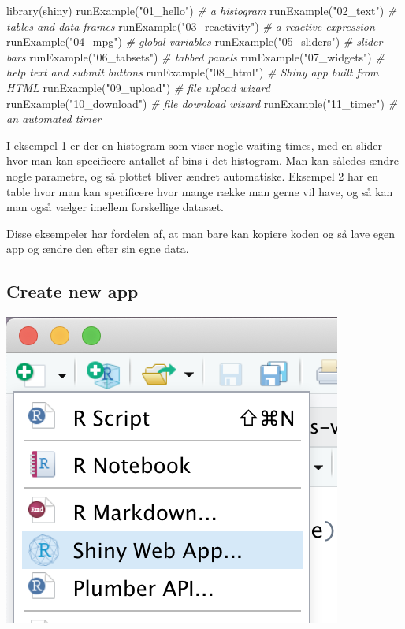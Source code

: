 \documentclass[
]{book}
\newenvironment{Shaded}{\begin{snugshade}}{\end{snugshade}}
\newcommand{\CommentTok}[1]{\textcolor[rgb]{0.56,0.35,0.01}{\textit{#1}}}
\newcommand{\FunctionTok}[1]{\textcolor[rgb]{0.00,0.00,0.00}{#1}}
\newcommand{\NormalTok}[1]{#1}
\newcommand{\StringTok}[1]{\textcolor[rgb]{0.31,0.60,0.02}{#1}}
\begin{document}
\begin{Shaded}
\begin{Highlighting}[]
\FunctionTok{library}\NormalTok{(shiny)}
\FunctionTok{runExample}\NormalTok{(}\StringTok{"01\_hello"}\NormalTok{)      }\CommentTok{\# a histogram}
\FunctionTok{runExample}\NormalTok{(}\StringTok{"02\_text"}\NormalTok{)       }\CommentTok{\# tables and data frames}
\FunctionTok{runExample}\NormalTok{(}\StringTok{"03\_reactivity"}\NormalTok{) }\CommentTok{\# a reactive expression}
\FunctionTok{runExample}\NormalTok{(}\StringTok{"04\_mpg"}\NormalTok{)        }\CommentTok{\# global variables}
\FunctionTok{runExample}\NormalTok{(}\StringTok{"05\_sliders"}\NormalTok{)    }\CommentTok{\# slider bars}
\FunctionTok{runExample}\NormalTok{(}\StringTok{"06\_tabsets"}\NormalTok{)    }\CommentTok{\# tabbed panels}
\FunctionTok{runExample}\NormalTok{(}\StringTok{"07\_widgets"}\NormalTok{)    }\CommentTok{\# help text and submit buttons}
\FunctionTok{runExample}\NormalTok{(}\StringTok{"08\_html"}\NormalTok{)       }\CommentTok{\# Shiny app built from HTML}
\FunctionTok{runExample}\NormalTok{(}\StringTok{"09\_upload"}\NormalTok{)     }\CommentTok{\# file upload wizard}
\FunctionTok{runExample}\NormalTok{(}\StringTok{"10\_download"}\NormalTok{)   }\CommentTok{\# file download wizard}
\FunctionTok{runExample}\NormalTok{(}\StringTok{"11\_timer"}\NormalTok{)      }\CommentTok{\# an automated timer}
\end{Highlighting}
\end{Shaded}

I eksempel 1 er der en histogram som viser nogle waiting times, med en slider hvor man kan specificere antallet af bins i det histogram. Man kan således ændre nogle parametre, og så plottet bliver ændret automatiske. Eksempel 2 har en table hvor man kan specificere hvor mange række man gerne vil have, og så kan man også vælger imellem forskellige datasæt.

Disse eksempeler har fordelen af, at man bare kan kopiere koden og så lave egen app og ændre den efter sin egne data.

\hypertarget{create-new-app}{%
\subsection{Create new app}\label{create-new-app}}

\includegraphics[width=0.4\linewidth]{plots/shiny_new}
\end{document}
